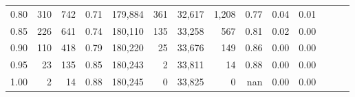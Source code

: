 \begin{tabular}{rrrrrrrrrrrrrr}
0.80 &     310 &    742 &  0.71 &  179,884 &      361 &  32,617 &   1,208 &  0.77 &  0.04 &      0.01 \\
0.85 &     226 &    641 &  0.74 &  180,110 &      135 &  33,258 &     567 &  0.81 &  0.02 &      0.00 \\
0.90 &     110 &    418 &  0.79 &  180,220 &       25 &  33,676 &     149 &  0.86 &  0.00 &      0.00 \\
0.95 &      23 &    135 &  0.85 &  180,243 &        2 &  33,811 &      14 &  0.88 &  0.00 &      0.00 \\
1.00 &       2 &     14 &  0.88 &  180,245 &        0 &  33,825 &       0 &   nan &  0.00 &      0.00 \\
\bottomrule
\end{tabular}
